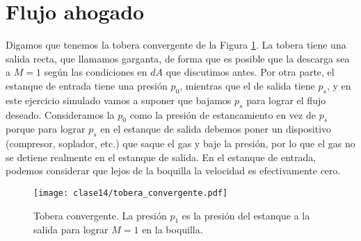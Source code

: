 \section*{Flujo ahogado}

Digamos que tenemos la tobera convergente de la Figura \ref{fig:tobera_convergente}.
La tobera tiene una salida recta, que llamamos garganta, de forma que es posible que la descarga sea a $M=1$ según las condiciones en $dA$ que discutimos antes. 
Por otra parte, el estanque de entrada tiene una presión $p_0$, mientras que el de salida tiene $p_s$, y en este ejercicio simulado vamos a suponer que bajamos $p_s$ para lograr el flujo deseado.
Consideramos la $p_0$ como la presión de estancamiento en vez de $p_s$ porque para lograr $p_s$ en el estanque de salida debemos poner un dispositivo (compresor, soplador, etc.) que saque el gas y baje la presión, por lo que el gas no se detiene realmente en el estanque de salida. 
En el estanque de entrada, podemos considerar que lejos de la boquilla la velocidad es efectivamente cero.
%
\begin{figure}
\centering
\texttt{[image: clase14/tobera\_convergente.pdf]}
\caption{Tobera convergente. La presión $p_1$ es la presión del estanque a la salida para lograr $M=1$ en la boquilla.}
\label{fig:tobera_convergente}
\end{figure}

